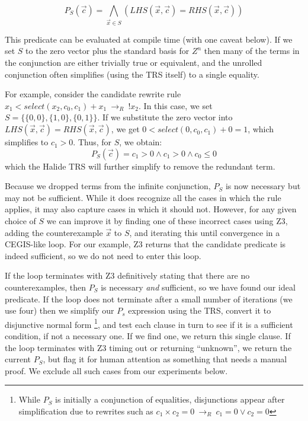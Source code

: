 \documentclass[acmsmall,review,anonymous]{acmart}\settopmatter{printfolios=true,printccs=false,printacmref=false}
\newcommand{\rewrites}[0]{\:\rightarrow_{R}\:}
\begin{document}
\[
P_S(\vec{c}) = \bigwedge\limits_{\vec{x} \in S} ( LHS(\vec{x}, \vec{c}) = RHS(\vec{x}, \vec{c}) )
\]

This predicate can be evaluated at compile time (with one caveat
below). If we set $S$ to the zero vector plus the standard basis for
$Z^n$ then many of the terms in the conjunction are either trivially
true or equivalent, and the unrolled conjunction often simplifies
(using the TRS itself) to a single equality.

For example, consider the candidate rewrite rule
$x_1 < select(x_2, c_0, c_1) + x_1 \rewrites !x_2$.  In this case,
we set $S = \{\{0, 0\}, \{1, 0\}, \{0, 1\}\}$.  If we substitute the zero
vector into $LHS(\vec{x}, \vec{c}) = RHS(\vec{x}, \vec{c})$, we get
$0 < select(0, c_0, c_1) + 0 = 1$, which simplifies to $c_1 > 0$.  Thus, for $S$,
we obtain:
$$P_S(\vec{c}) = c_1 > 0 \wedge c_1 > 0 \wedge c_0 \le 0$$
which the Halide TRS will further simplify to remove the redundant term.

Because we dropped terms from the infinite conjunction, $P_S$
is now necessary but may not be sufficient. While it does recognize all the
cases in which the rule applies, it may also capture cases in which it
should not. However, for any given choice of $S$ we can improve it by
finding one of these incorrect cases using Z3, adding the
counterexample $\vec{x}$ to $S$, and iterating this until convergence in a
CEGIS-like loop.  For our example, Z3 returns that the candidate
predicate is indeed sufficient, so we do not need to enter this loop.


If the loop terminates with Z3 definitively stating that there are
no counterexamples, then $P_S$ is necessary \emph{and} sufficient, so
we have found our ideal predicate. If the loop does not terminate
after a small number of iterations (we use four) then we simplify our
$P_s$ expression using the TRS, convert it to disjunctive normal
form \footnote{While $P_S$ is initially a conjunction of equalities,
  disjunctions appear after simplification due to rewrites such as
  $c_1 \times c_2 = 0 \rewrites c_1 = 0 \vee c_2 = 0$}, and test
each clause in turn to see if it is a sufficient condition, if not a
necessary one. If we find one, we return this single clause. If the
loop terminates with Z3 timing out or returning ``unknown'', we return
the current $P_S$, but flag it for human attention as something that
needs a manual proof. We exclude all such cases from our experiments
below.
\end{document}
